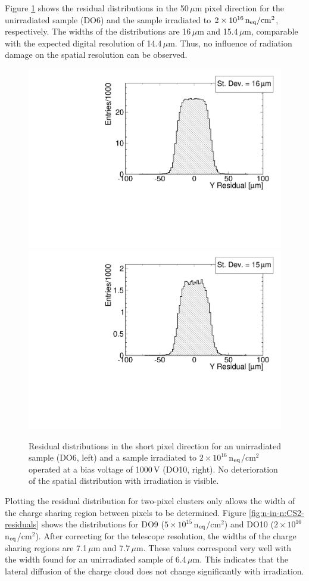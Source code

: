  Figure \ref{fig:n-in-n:residuals} shows the residual distributions in the 50\,$\mu$m pixel direction for the unirradiated sample (DO6) and the sample irradiated to
\mbox{$2\times10^{16}\,{\rm n_{eq}}/{\rm cm}^2$}, respectively. The widths of the distributions are 16\,$\mu$m and 15.4\,$\mu$m, comparable with the expected digital resolution of 14.4\,$\mu$m. Thus, no influence of radiation damage on the spatial resolution can be observed.

\begin{figure}[!htb]
 \begin{center}
  \includegraphics[width=.49\textwidth]{Oct_Period1-residuals2-11-fitResY.pdf}
  \includegraphics[width=.49\textwidth]{Oct_Period5-residuals2-11-fitResY.pdf}
 \end{center}
 \caption{Residual distributions in the short pixel direction for an unirradiated sample (DO6, left) and a sample irradiated to $2\times 10^{16}$\,n$_{\rm eq}$/cm$^2$ operated at a bias voltage of 1000\,V (DO10, right). No deterioration of the spatial distribution with irradiation is visible. \label{fig:n-in-n:residuals}}
\end{figure}


Plotting the residual distribution for two-pixel clusters only allows the width of the charge sharing region between pixels to be determined. Figure \ref{fig:n-in-n:CS2-residuals} shows the distributions for DO9 ($5\times 10^{15}$\,n$_{\rm eq}$/cm$^2$) and DO10 ($2\times 10^{16}$\,n$_{\rm eq}$/cm$^2$). After correcting for the telescope resolution, the widths of the charge sharing regions are 7.1\,$\mu$m and 7.7\,$\mu$m. These values correspond very well with the width found for an unirradiated sample of 6.4\,$\mu$m. This indicates that the lateral diffusion of the charge cloud does not change significantly with irradiation.

